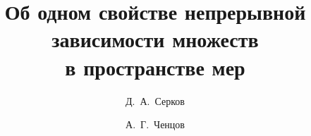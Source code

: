 

\usepackage{todonotes} %

\usepackage[russian]{nla}

%
%


%




%
\fi

\title{Об одном свойстве непрерывной зависимости множеств\\ в пространстве мер}%
\author{Д.~А.~Серков\inst{}  %
  \and  %
А.~Г.~Ченцов\inst{}
  \and
} %


\maketitle

